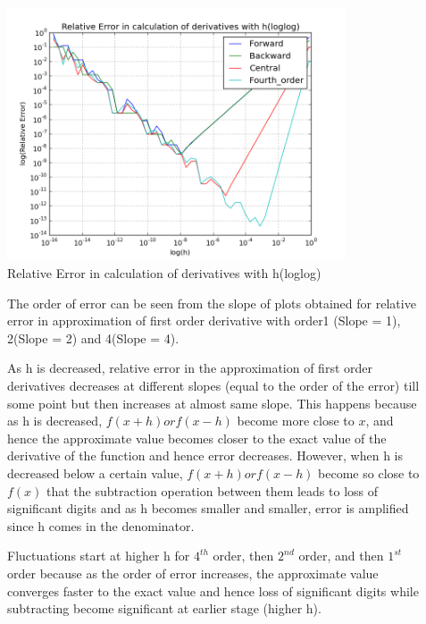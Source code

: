 \documentclass{article}
\begin{document}
\begin{figure}[H] \label{figure}
\includegraphics[width=10cm]{five.png}
\caption{Relative Error in calculation of derivatives with h(loglog)}
\label{figure:}
\end{figure}
\begin{description}
\item[] The order of error can be seen from the slope of plots obtained for relative error in approximation of first order derivative with order1 (Slope = 1), 2(Slope = 2) and 4(Slope = 4). 
\item[] As h is decreased, relative error in the approximation of first order derivatives decreases at different slopes (equal to the order of the error) till some point but then increases at almost same slope. 
This happens because as h is decreased, $f(x+h) or f(x-h)$ become more close to $x$, and hence the approximate value becomes closer to the exact value of the derivative of the function and hence error decreases. 
However, when h is decreased below a certain value, $f(x+h) or f(x-h)$ become so close to $f(x)$ that the subtraction operation between them leads to loss of significant digits and as h becomes smaller and smaller, error is amplified since h comes in the denominator.

\item[] Fluctuations start at higher h for $4^{th}$ order, then $2^{nd}$ order, and then $1^{st}$ order because as the order of error increases, the approximate value converges faster to the exact value and hence loss of significant digits while subtracting become significant at earlier stage (higher h).  
\end{description}
\end{document}
